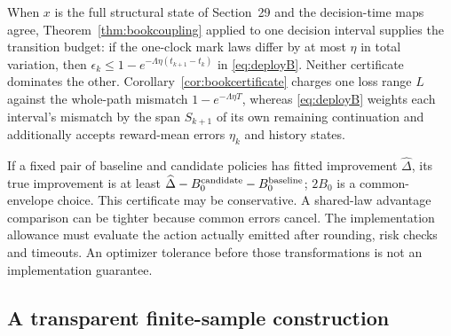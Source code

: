 \begin{remarkplain}
When $x$ is the full structural state of Section~29 and the decision-time maps
agree, Theorem~\ref{thm:bookcoupling} applied to one decision interval
supplies the transition budget: if the one-clock mark laws differ by at most
$\eta$ in total variation, then
$\epsilon_k\le 1-e^{-\Lambda\eta(t_{k+1}-t_k)}$ in \eqref{eq:deployB}. Neither certificate
dominates the other. Corollary~\ref{cor:bookcertificate} charges one loss range $L$
against the whole-path mismatch $1-e^{-\Lambda\eta T}$, whereas \eqref{eq:deployB} weights
each interval's mismatch by the span $S_{k+1}$ of its own remaining
continuation and additionally accepts reward-mean errors $\eta_k$ and
history states.
\end{remarkplain}

If a fixed pair of baseline and candidate policies has fitted improvement
$\widehat\Delta$, its true improvement is at least
$\widehat\Delta-B_0^{\rm candidate}-B_0^{\rm baseline}$; $2B_0$ is a
common-envelope choice. This certificate may be conservative. A shared-law
advantage comparison can be tighter because common errors cancel.
The implementation allowance must evaluate the action actually emitted
after rounding, risk checks and timeouts. An optimizer tolerance before
those transformations is not an implementation guarantee.

\subsection{A transparent finite-sample construction}

